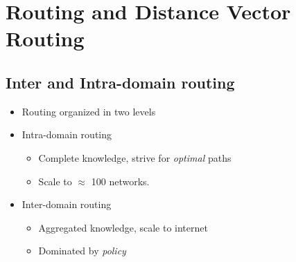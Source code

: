 \section{Routing and Distance Vector Routing}
\subsection{Inter and Intra-domain routing}
\begin{itemize}[nosep]
    \item Routing organized in two levels
    \item Intra-domain routing
          \begin{itemize}[nosep]
              \item Complete knowledge, strive for \emph{optimal} paths
              \item Scale to $\approx$ 100 networks.
          \end{itemize}
    \item Inter-domain routing
          \begin{itemize}[nosep]
              \item Aggregated knowledge, scale to internet
              \item Dominated by \emph{policy}
          \end{itemize}
\end{itemize}
